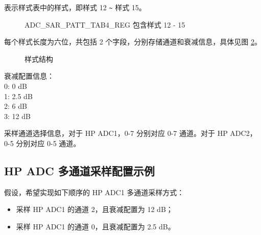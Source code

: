 \documentclass[main\_\_CN.tex]{subfiles}
\begin{document}
%
%
%
%
%
\begin{regdesc}\begin{reglist}
\item [cmd \regindex{n} (\regindex{n} = 12 - 15)] 表示样式表中的样式，即样式 12 \verb+~+ 样式 15。
\end{reglist}\end{regdesc}
\vspace{-2em}
\begin{figure}[H]
    \centering
    \caption{ADC\_SAR\_PATT\_TAB4\_REG 包含样式 12 - 15}
    \label{fig:pattern-tab-4}
\end{figure}
\vspace{-2em}
每个样式长度为六位，共包括 2 个字段，分别存储通道和衰减信息，具体见图 \ref{tab:pattern-table-register}。

\begin{figure}[H]
\centering
{}%
%
\end{figure}
\vspace{-2em}
\begin{figure}[H]
    \centering
    \caption{样式结构}
    \label{tab:pattern-table-register}
\end{figure}
\vspace{-2em}
\begin{regdesc}\begin{reglist}
\item [atten] 衰减配置信息：\\
0: 0 dB\\
1: 2.5 dB\\
2: 6 dB\\
3: 12 dB
\item [ch\_sel] 采样通道选择信息，对于 HP ADC1，0-7 分别对应 0-7 通道。对于 HP ADC2，0-5 分别对应 0-5 通道。
\end{reglist}\end{regdesc}


\subsection{HP ADC 多通道采样配置示例}

假设，希望实现如下顺序的 HP ADC1 多通道采样方式：
\begin{itemize}
    \item 采样 HP ADC1 的通道 2，且衰减配置为 12 dB；
    \item 采样 HP ADC1 的通道 0，且衰减配置为 2.5 dB。
\end{itemize}
\end{document}
